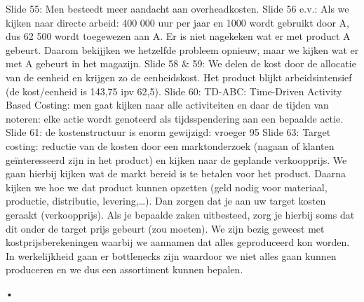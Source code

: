 \documentclass[10pt,a4paper]{report}
\begin{document}
Slide 55: Men besteedt meer aandacht aan overheadkosten.
Slide 56 e.v.: Als we kijken naar directe arbeid: 400 000 uur per jaar en 1000 wordt gebruikt door A, dus 62 500 wordt toegewezen aan A. Er is niet nagekeken wat er met product A gebeurt. Daarom bekijjken we hetzelfde probleem opnieuw, maar we kijken wat er met A gebeurt in het magazijn.
Slide 58 $\&$ 59: We delen de kost door de allocatie van de eenheid en krijgen zo de eenheidskost. Het product blijkt arbeidsintensief (de kost/eenheid is 143,75 ipv 62,5).
Slide 60: TD-ABC: Time-Driven Activity Based Costing: men gaat kijken naar alle activiteiten en daar de tijden van noteren: elke actie wordt genoteerd als tijdsspendering aan een bepaalde actie.
Slide 61: de kostenstructuur is enorm gewijzigd: vroeger 95%
Slide 63: Target costing: reductie van de kosten door een marktonderzoek (nagaan of klanten geïnteresseerd zijn in het product) en kijken naar de geplande verkoopprijs. We gaan hierbij kijken wat de markt bereid is te betalen voor het product. Daarna kijken we hoe we dat product kunnen opzetten (geld nodig voor materiaal, productie, distributie, levering,…). Dan zorgen dat je aan uw target kosten geraakt (verkoopprijs). Als je bepaalde zaken uitbesteed, zorg je hierbij soms dat dit onder de target prijs gebeurt (zou moeten).
We zijn bezig geweest met kostprijsberekeningen waarbij we aannamen dat alles geproduceerd kon worden. In werkelijkheid gaan er bottlenecks zijn waardoor we niet alles gaan kunnen produceren en we dus een assortiment kunnen bepalen. 

      

  

					  
		    
		 
      
		     
			  
			    
		         
		 
     
 
     
				 
				 
  
	•

  

 

 

 

 

 
\end{document}
